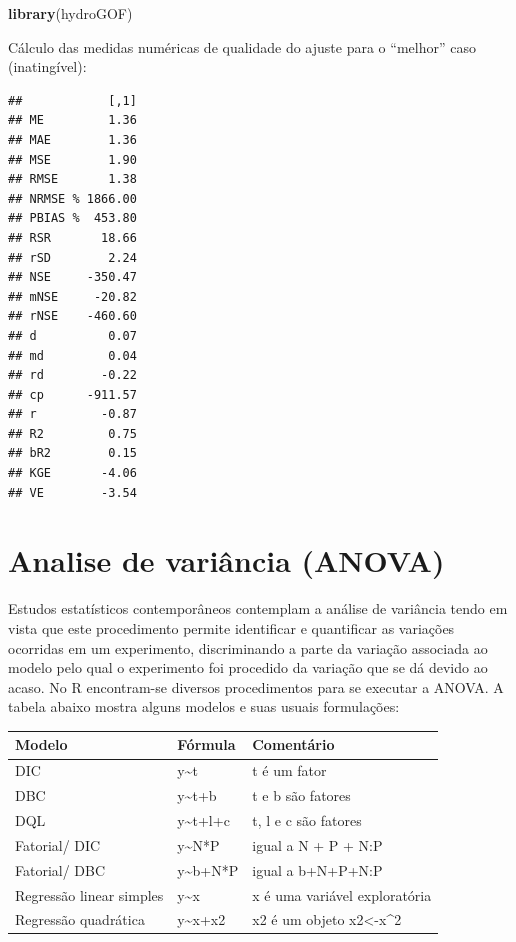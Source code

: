 \documentclass[
]{book}
\newenvironment{Shaded}{\begin{snugshade}}{\end{snugshade}}
\newcommand{\DataTypeTok}[1]{\textcolor[rgb]{0.13,0.29,0.53}{#1}}
\newcommand{\KeywordTok}[1]{\textcolor[rgb]{0.13,0.29,0.53}{\textbf{#1}}}
\newcommand{\NormalTok}[1]{#1}
\newcommand{\OperatorTok}[1]{\textcolor[rgb]{0.81,0.36,0.00}{\textbf{#1}}}
\begin{document}
\begin{Shaded}
\begin{Highlighting}[]
\KeywordTok{library}\NormalTok{(hydroGOF)}
\end{Highlighting}
\end{Shaded}

Cálculo das medidas numéricas de qualidade do ajuste para o ``melhor'' caso (inatingível):

\begin{Shaded}
\end{Shaded}

\begin{verbatim}
##            [,1]
## ME         1.36
## MAE        1.36
## MSE        1.90
## RMSE       1.38
## NRMSE % 1866.00
## PBIAS %  453.80
## RSR       18.66
## rSD        2.24
## NSE     -350.47
## mNSE     -20.82
## rNSE    -460.60
## d          0.07
## md         0.04
## rd        -0.22
## cp      -911.57
## r         -0.87
## R2         0.75
## bR2        0.15
## KGE       -4.06
## VE        -3.54
\end{verbatim}

\hypertarget{analise-de-variuxe2ncia-anova}{%
\chapter{Analise de variância (ANOVA)}\label{analise-de-variuxe2ncia-anova}}

Estudos estatísticos contemporâneos contemplam a análise de variância tendo em vista que este procedimento permite identificar e quantificar as variações ocorridas em um experimento, discriminando a parte da variação associada ao modelo pelo qual o experimento foi procedido da variação que se dá devido ao acaso.
No R encontram-se diversos procedimentos para se executar a ANOVA. A tabela abaixo mostra alguns modelos e suas usuais formulações:

\begin{longtable}[]{@{}lll@{}}
\toprule
Modelo & Fórmula & Comentário\tabularnewline
\midrule
\endhead
DIC & y\textasciitilde t & t é um fator\tabularnewline
DBC & y\textasciitilde t+b & t e b são fatores\tabularnewline
DQL & y\textasciitilde t+l+c & t, l e c são fatores\tabularnewline
Fatorial/ DIC & y\textasciitilde N*P & igual a N + P + N:P\tabularnewline
Fatorial/ DBC & y\textasciitilde b+N*P & igual a b+N+P+N:P\tabularnewline
Regressão linear simples & y\textasciitilde x & x é uma variável exploratória\tabularnewline
Regressão quadrática & y\textasciitilde x+x2 & x2 é um objeto x2\textless-x\^{}2\tabularnewline
\bottomrule
\end{longtable}
\end{document}
